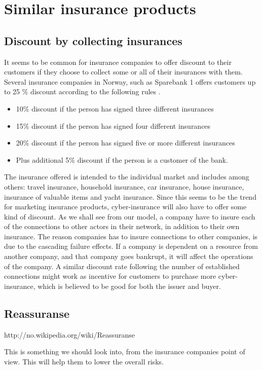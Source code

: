 \chapter{Similar insurance products}
\label{chp:similarInsuranceProducts} 


\section{Discount by collecting insurances}

It seems to be common for insurance companies to offer discount to their customers if they choose to collect some or all of their insurances with them. Several insurance companies in Norway, such as Sparebank 1  offers customers up to 25 $\%$ discount according to the following rules \cite{sparebank1}. 

\begin{itemize}

\item 10$\%$ discount if the person has signed three different insurances
\item 15$\%$ discount if the person has signed four different insurances
\item 20$\%$ discount if the person has signed five or more different insurances
\item Plus additional 5$\%$ discount if the person is a customer of the bank. 

\end{itemize}

The insurance offered is intended to the individual market and includes among others: travel insurance, household insurance, car insurance, house insurance, insurance of valuable items and yacht insurance. Since this seems to be the trend for marketing insurance products, cyber-insurance will also have to offer some kind of discount. As we shall see from our model, a company have to insure each of the connections to other actors in their network, in addition to their own insurance. The reason companies has to insure connections to other companies, is due to the cascading failure effects. If a company is dependent on a resource from another company, and that company goes bankrupt, it will affect the operations of the company. A similar discount rate following the number of established connections might work as incentive for customers to purchase more cyber-insurance, which is believed to be good for both the issuer and buyer. 


\section{Reassuranse}
http://no.wikipedia.org/wiki/Reassuranse

This is something we should look into, from the insurance companies point of view. This will help them to lower the overall risks. 